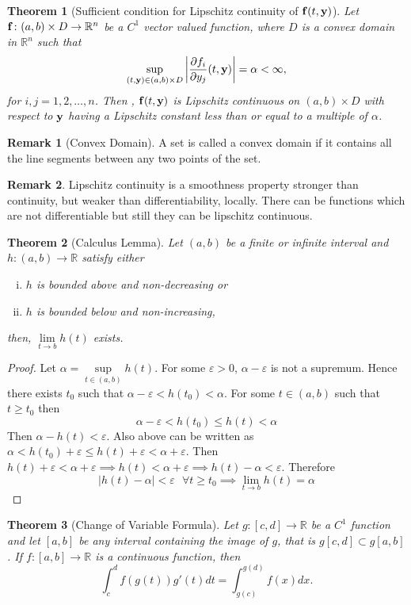\documentclass[12pt,reqno]{amsart}
\theoremstyle{plain}
\newtheorem{thm}{Theorem}
\theoremstyle{definition}
\newtheorem{rem}{Remark}
\begin{document}
\begin{thm}[Sufficient condition for Lipschitz continuity of ${\bf f}(t, {\bf y})$]
    Let ${\bf f} \colon (a,b) \times D \to \mathbb{R}^n$ be a $C^1$ vector valued function, where $D$ is a convex domain in $\mathbb{R}^n$ such that
    $$ \sup\limits_{(t, {\bf y}) \in (a,b) \times D} \left|\frac{\partial f_i}{\partial y_j}(t, {\bf y})\right| = \alpha < \infty,$$
    for $i,j = 1,2,\dots, n$. Then , ${\bf f}(t, {\bf y})$ is Lipschitz continuous on $(a,b) \times D$ with respect to ${\bf y}$ having a Lipschitz constant less than or equal to a multiple of $\alpha$.
\end{thm}
\begin{rem}[Convex Domain]
    A set is called a convex domain if it contains all the line segments between any two points of the set.
\end{rem}
\begin{rem}
    Lipschitz continuity is a smoothness property stronger than continuity, but weaker than differentiability, locally. There can be functions which are not differentiable but still they can be lipschitz continuous.
\end{rem}
\begin{thm}[Calculus Lemma]
    Let $(a,b)$ be a finite or infinite interval and $h \colon (a,b) \to \mathbb{R}$ satisfy either
    \begin{enumerate}[(i)]
        \item $h$ is bounded above and non-decreasing or
        \item $h$ is bounded below and non-increasing,
    \end{enumerate}
    then, $\lim\limits_{t \to b} h(t)$ exists.    
\end{thm}
\begin{proof}
    Let $\alpha = \sup\limits_{t \in (a,b)} h(t)$. For some $\varepsilon > 0$, $\alpha - \varepsilon$ is not a supremum. Hence there exists $t_0$ such that $\alpha - \varepsilon < h(t_0) < \alpha$. For some $t \in (a,b)$ such that $t \geq t_0$ then 
    $$\alpha - \varepsilon < h(t_0) \leq h(t) < \alpha$$ 
    Then $\alpha - h(t) < \varepsilon$. Also above can be written as $ \alpha < h(t_0) + \varepsilon \leq h(t) + \varepsilon < \alpha + \varepsilon$. Then $h(t) + \varepsilon < \alpha + \varepsilon \implies h(t) < \alpha + \varepsilon \implies h(t) - \alpha < \varepsilon$. Therefore
    $$ |h(t) - \alpha| < \varepsilon \text{ }\forall t \geq t_0 \implies \lim\limits_{t \to b}h(t) = \alpha$$
\end{proof}
\begin{thm}[Change of Variable Formula]
    Let $g \colon [c,d] \to \mathbb{R}$ be a $C^1$ function and let $[a,b]$ be any interval containing the image of $g$, that is $g[c,d] \subset g[a,b]$. If $f \colon[a,b] \to \mathbb{R}$ is a continuous function, then
    $$ \int_c^d f(g(t))g'(t) dt = \int_{g(c)}^{g(d)} f(x) dx.$$
\end{thm}
\end{document}
